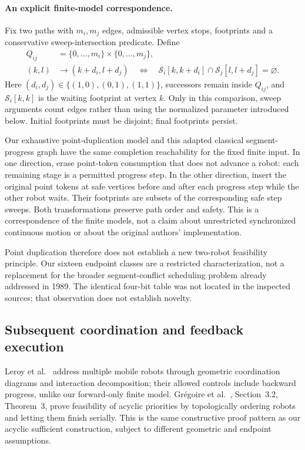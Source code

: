\documentclass[11pt,a4paper]{article}
\theoremstyle{remark}
\newcommand{\Sw}{\mathcal S}
\begin{document}
\paragraph{An explicit finite-model correspondence.}
Fix two paths with $m_i,m_j$ edges, admissible vertex stops, footprints
and a conservative sweep-intersection predicate. Define
\begin{equation}
\begin{split}
 Q_{ij}&=\{0,\ldots,m_i\}\times\{0,\ldots,m_j\},\\
 (k,l)&\longrightarrow(k+d_i,l+d_j)
 \quad\Longleftrightarrow\quad
 \Sw_i[k,k+d_i]\cap\Sw_j[l,l+d_j]=\varnothing.
\end{split}
\label{eq:prior-progress}
\end{equation}
Here $(d_i,d_j)\in\{(1,0),(0,1),(1,1)\}$, successors remain inside
$Q_{ij}$, and $\Sw_i[k,k]$ is the waiting footprint at vertex $k$.
Only in this comparison, sweep arguments count edges rather than using
the normalized parameter introduced below. Initial footprints must be
disjoint; final footprints persist.

Our exhaustive point-duplication model and this adapted classical
segment-progress graph have the same completion reachability for the fixed
finite input. In one direction, erase point-token consumption that does not
advance a robot: each remaining stage is a permitted progress step. In the
other direction, insert the original point tokens at safe vertices before
and after each progress step while the other robot waits. Their footprints
are subsets of the corresponding safe step sweeps. Both transformations
preserve path order and safety. This is a correspondence of the finite
models, not a claim about unrestricted synchronized continuous motion or
about the original authors' implementation.

Point duplication therefore does not establish a new two-robot feasibility
principle. Our sixteen endpoint classes are a restricted characterization,
not a replacement for the broader segment-conflict scheduling problem
already addressed in 1989. The identical four-bit table was not located in
the inspected sources; that observation does not establish novelty.

\subsection{Subsequent coordination and feedback execution}
Leroy et al.~\cite{leroy1999} address multiple mobile robots through geometric
coordination diagrams and interaction decomposition; their allowed controls
include backward progress, unlike our forward-only finite model.
Gr\'egoire et al.~\cite{gregoire2015}, Section~3.2, Theorem~3, prove
feasibility of acyclic priorities by topologically ordering robots and
letting them finish serially. This is the same constructive proof pattern
as our acyclic sufficient construction, subject to different geometric and
endpoint assumptions.
\end{document}
